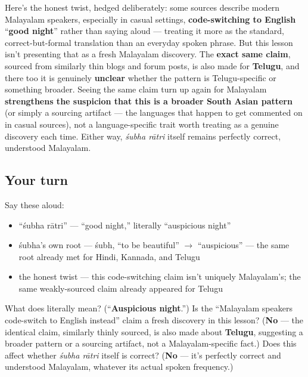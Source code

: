 \begin{cousinweb}
Here's the honest twist, hedged deliberately: some sources describe modern Malayalam speakers, especially in casual settings, \textbf{code-switching to English} \textquotedblleft{}\textbf{good night}\textquotedblright{} rather than saying \textbf{ } aloud — treating it more as the standard, correct-but-formal translation than an everyday spoken phrase. But this lesson isn't presenting that as a fresh Malayalam discovery. The \textbf{exact same claim}, sourced from similarly thin blogs and forum posts, is also made for \textbf{Telugu}, and there too it is genuinely \textbf{unclear} whether the pattern is Telugu-specific or something broader. Seeing the same claim turn up again for Malayalam \textbf{strengthens the suspicion that this is a broader South Asian pattern} (or simply a sourcing artifact — the languages that happen to get commented on in casual sources), not a language-specific trait worth treating as a genuine discovery each time. Either way, \emph{śubha rātri} itself remains perfectly correct, understood Malayalam.
\end{cousinweb}

\subsection*{Your turn}
Say these aloud:

\begin{itemize}
\raggedright
  \item \textquotedblleft{}śubha rātri\textquotedblright{} — \textquotedblleft{}good night,\textquotedblright{} literally \textquotedblleft{}auspicious night\textquotedblright{}
  \item śubha's own root — śubh, \textquotedblleft{}to be beautiful\textquotedblright{} $\to$ \textquotedblleft{}auspicious\textquotedblright{} — the same root already met for Hindi, Kannada, and Telugu
  \item the honest twist — this code-switching claim isn't uniquely Malayalam's; the same weakly-sourced claim already appeared for Telugu
\end{itemize}

\begin{tcolorbox}[breakable,colback=teal!4,colframe=teal!35!black,title={Before you move on}]
What does \textbf{ } literally mean? (\textquotedblleft{}\textbf{Auspicious night}.\textquotedblright{}) Is the \textquotedblleft{}Malayalam speakers code-switch to English instead\textquotedblright{} claim a fresh discovery in this lesson? (\textbf{No} — the identical claim, similarly thinly sourced, is also made about \textbf{Telugu}, suggesting a broader pattern or a sourcing artifact, not a Malayalam-specific fact.) Does this affect whether \emph{śubha rātri} itself is correct? (\textbf{No} — it's perfectly correct and understood Malayalam, whatever its actual spoken frequency.)
\end{tcolorbox}
